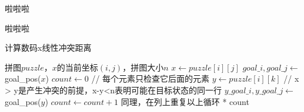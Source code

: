 \documentclass[10pt,letterpaper]{ctexart}
\newcommand{\figref}[1]{图\ref{#1}}
\begin{document}
\begin{enumerate}[itemindent=2.5em,label=\arabic*、]
\begin{enumerate}[itemindent=1.5em,label=（\arabic*）]
      \par \qquad 啦啦啦
      \par \qquad 啦啦啦
      \begin{algorithm}
        \caption{计算数码x线性冲突距离}
          \begin{algorithmic}[1] %
              \Require 拼图$puzzle$，$x$的当前坐标$(i,j)$，拼图大小$n$
                \State $x \gets puzzle[i][j]$
                \State $goal\_i,goal\_j \gets$ goal\_pos($x$)
                \State $count \gets 0$
                \State // 每个元素只检查它后面的元素
                \For {$k \in [j+1,n)$}
                  \State $y \gets puzzle[i][k]$
                  \State // x > y是产生冲突的前提，x-y<n表明可能在目标状态的同一行
                    \State $y\_goal\_i,y\_goal\_j \gets$ goal\_pos($y$)
                      \State $count \gets count + 1$
                    \EndIf
                  \EndIf
                \EndFor
                \State 同理，在列上重复以上循环
                \State {} * count
              \EndFunction
          \end{algorithmic}
      \end{algorithm}

    \end{enumerate}
\end{enumerate}
\end{document}
